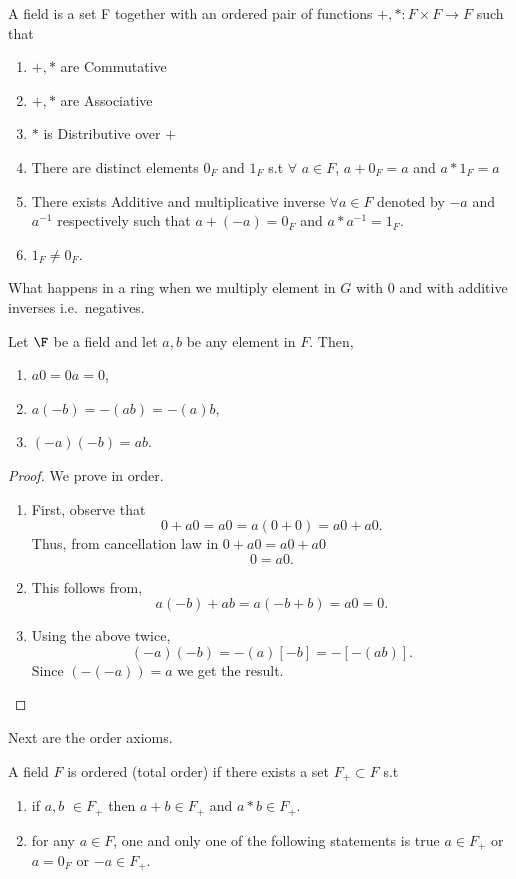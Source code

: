 \begin{Definition}[name=Field]
	A field is a set F together with an ordered pair of functions 
	$ + , * : F \times F \rightarrow F$ such that 
\begin{enumerate}
    \item $ + , *$ are Commutative 
    \item $ + , *$ are Associative
    \item $ * $ is Distributive over $ + $
    \item There are distinct elements $0_F$ and $1_F$ s.t $\forall$ 
	$a \in F$, $ a + 0_F = a$ and $ a * 1_F = a$
    \item There exists Additive and multiplicative inverse $ \forall a \in
	F$ denoted by $-a$ and $a^{-1}$ respectively such that 
	$ a + (-a) = 0_F $ and $ a * a^{-1} = 1_F $.
    \item $1_{F} \neq 0_{F}$.
\end{enumerate}
\end{Definition}
What happens in a ring when we multiply element in $G$ with $0$ and with additive inverses i.e.~negatives.
\begin{Proposition}
    Let $\F$ be a field and let
    $a,b$ be any element in $F$. Then,
    \begin{enumerate}
	\item
	    $a0 = 0a = 0$,
	\item
	    $a(-b) = -(ab) = -(a)b$, 
	\item
	    $(-a)(-b) = ab$.
    \end{enumerate}
\end{Proposition}
\begin{proof}
    We prove in order.
    \begin{enumerate}
	\item
	    First, observe that
	    \[0 + a0 = a0 = a(0 + 0) = a0 + a0.\]
	    Thus, from cancellation law in $0 + a0 = a0 + a0$
	    \[0 = a0.\]
	\item
	    This follows from,
	    \[a(-b) + ab = a(-b + b) = a0 = 0.\]

	\item
	    Using the above twice,
	    \[(-a)(-b) = -(a)\left[-b\right] = -\left[-(ab)\right].\]
	    Since $(-(-a)) = a$ we get the result.
    \end{enumerate}
\end{proof}
Next are the order axioms. 
\begin{Definition}
	A field $F$ is ordered  
	(total order) if there exists a set $F_{+} 
	\subset F$ s.t 
	\begin{enumerate}
		\item if $a,b$ $\in F_{+}$ then $a + b \in F_{+}$ and $a*b \in
			F_{+}$.
		\item for any $a \in F$, one and only one of the following 
		statements is true $ a \in F_{+} $ or $ a = 0_F $ or $ -a \in
		F_{+}$. 	
	\end{enumerate}
\end{Definition}
